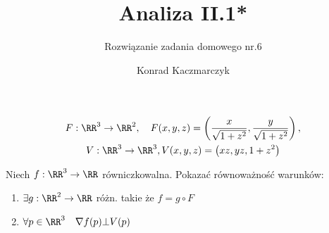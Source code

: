 \documentclass[11pt]{scrartcl}
\author{Konrad Kaczmarczyk}
\begin{document}
  \title{Analiza II.1*}
  \subtitle{Rozwiązanie zadania domowego nr.6}
  \maketitle
    \begin{zadanie*} 
      \begin{gather*}
          F: \RR^3 \to \RR^2, \quad 
          F(x,y,z) = \left ( \frac{x}{\sqrt{1 + z^2} }, \frac{y}{\sqrt{1 + z^2} } \right ), \\
          V: \RR^3 \to \RR^3, V(x,y,z) = \left ( xz, yz, 1 + z^2 \right )
      \end{gather*}

        Niech $f: \RR^3 \to \RR $ równiczkowalna. Pokazać równoważność warunków:

        \begin{enumerate}
            \item $\exists g: \RR^2 \to \RR $ różn. takie że $f = g \circ F$
            \item $\forall p \in \RR^3 \quad \nabla f(p) \bot V(p)$
          \end{enumerate}
    \end{zadanie*}
    
\end{document}
